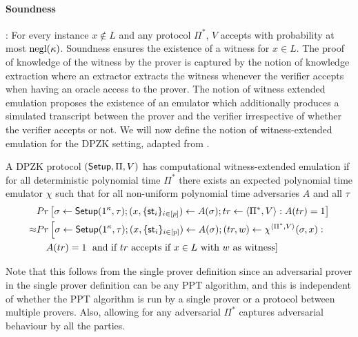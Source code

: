 \paragraph{Soundness}:  For every instance $x \notin L$ and any protocol $\Pi^*$, $V$ accepts with probability at most $\mathrm{negl}({\kappa})$.
Soundness ensures the existence of a witness for $x \in L$. The proof of knowledge of the witness by the prover is captured by the notion of knowledge extraction where an extractor extracts the witness whenever the verifier accepts when having an oracle access to the prover. The notion of witness extended emulation proposes the existence of an emulator which additionally produces a simulated transcript between the prover and the verifier irrespective of whether the verifier accepts or not. We will now define the notion of witness-extended emulation for the DPZK setting, adapted from \cite{Groth11}. 
\begin{definition}
A DPZK protocol $(\mathsf{Setup}, \Pi, V)$ has computational witness-extended emulation if for all deterministic polynomial time $\Pi^*$ there exists  an expected polynomial time emulator $\chi$ such that for all non-uniform polynomial time adversaries $A$ and all $\tau$
\begin{align*}
&Pr \left[\sigma \leftarrow \mathsf{Setup}(1^{\kappa}, \tau); (x, \{\mathsf{st}_i\}_{i \in [p]}) \leftarrow A(\sigma); tr \leftarrow \langle \Pi^*, V \rangle: A(tr) = 1 \right] \\
\approx &Pr \left[\sigma \leftarrow \mathsf{Setup}(1^{\kappa}, \tau); (x, \{\mathsf{st}_i\}_{i \in [p]}) \leftarrow A(\sigma); (tr, w) \leftarrow \chi^{\langle \Pi^*, V \rangle}(\sigma, x): \right. \\
&\,\,\,\,\,\, A(tr) = 1 \left. \text{ and if } tr \text{ accepts if } x \in L \text{ with } w \text{ as witness} \right] 
\end{align*}
\end{definition}
Note that this follows from the single prover definition since an adversarial prover in the single prover definition can be any PPT algorithm, and this is independent of whether the PPT algorithm is run by a single prover or a protocol between multiple provers.
Also, allowing for any adversarial $\Pi^*$ captures adversarial behaviour by all the parties.

